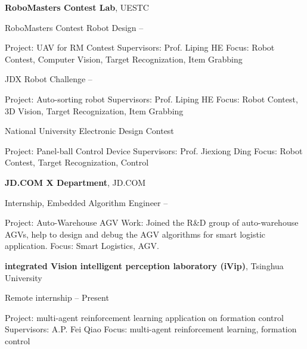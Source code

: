 \documentclass[letterpaper,MMMyyyy,nonstopmode]{simpleresumecv}
\begin{document}
\begin{Body}
\Gap
\Entry
{\textbf{RoboMasters Contest Lab}},
UESTC

\BulletItem
RoboMasters Contest Robot Design
\hfill
{} --
\begin{Detail}
	\SubBulletItem
	Project:
	UAV for RM Contest
	\SubBulletItem
	Supervisors:
	Prof. Liping HE
	\SubBulletItem
	Focus:
	Robot Contest, Computer Vision, Target Recognization, Item Grabbing
\end{Detail}

\BulletItem
JDX Robot Challenge
\hfill
{} --
\begin{Detail}
	\SubBulletItem
	Project:
	Auto-sorting robot
	\SubBulletItem
	Supervisors:
	Prof. Liping HE
	\SubBulletItem
	Focus:
	Robot Contest, 3D Vision, Target Recognization, Item Grabbing
\end{Detail}

\BulletItem
National University Electronic Design Contest
\hfill
{} 
\begin{Detail}
	\SubBulletItem
	Project:
	Panel-ball Control Device
	\SubBulletItem
	Supervisors:
	Prof. Jiexiong Ding
	\SubBulletItem
	Focus:
	Robot Contest, Target Recognization, Control
\end{Detail}

\Gap
\Entry
{\textbf{JD.COM X Department}}, JD.COM

\BulletItem
Internship, Embedded Algorithm Engineer
\hfill
{} --
\begin{Detail}
	\SubBulletItem
	Project:
	Auto-Warehouse AGV
	\SubBulletItem
	Work: Joined the R\&D group of auto-warehouse AGVs, help to design and debug the AGV algorithms for smart logistic application.
	\SubBulletItem
	Focus:
	Smart Logistics, AGV.
\end{Detail}

\Gap
\Entry
{\textbf{integrated Vision intelligent perception laboratory (iVip)}},
Tsinghua University

\BulletItem
Remote internship 
\hfill
{} --
Present
\begin{Detail}
\SubBulletItem
Project:
multi-agent reinforcement learning application on formation control
\SubBulletItem
Supervisors:
A.P. Fei Qiao
\SubBulletItem
Focus:
multi-agent reinforcement learning, formation control
\end{Detail}


\end{Body}
\end{document}
